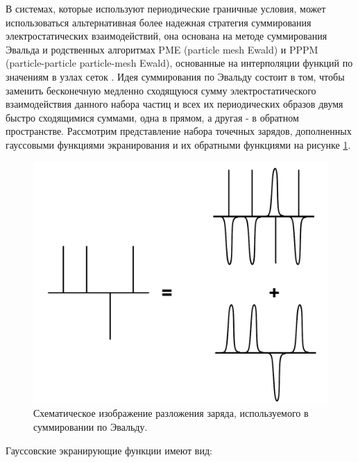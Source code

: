     В системах, которые используют периодические граничные условия, может использоваться альтернативная более надежная стратегия суммирования электростатических взаимодействий, она основана на методе суммирования Эвальда и родственных алгоритмах PME (particle mesh Ewald) и PPPM (particle-particle particle-mesh Ewald), основанные на интерполяции функций по значениям в узлах сеток \cite{frenkel_understanding_2002}. Идея суммирования по Эвальду состоит в том, чтобы заменить бесконечную медленно сходящуюся сумму электростатического взаимодействия данного набора частиц и всех их периодических образов двумя быстро сходящимися суммами, одна в прямом, а другая - в обратном пространстве. Рассмотрим представление набора точечных зарядов, дополненных гауссовыми функциями экранирования и их обратными функциями на рисунке \ref{fig:p1_1:f12}.

\begin{figure} [h!]
    \centering
    \includegraphics [width=\textwidth]{images/p1/part1_1_md/part1_1_md_f12.pdf}
    \caption{Схематическое изображение разложения заряда, используемого в суммировании по Эвальду.}
    \label{fig:p1_1:f12}
\end{figure}

    Гауссовские экранирующие функции имеют вид:

